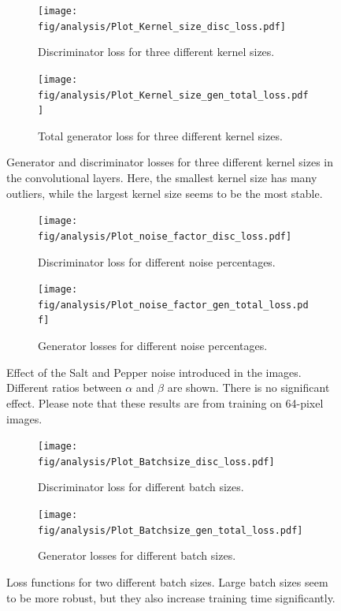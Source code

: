 \documentclass[fleqn,usenatbib,twocolumn]{mnras}
\begin{document}
\begin{figure}
	\centering
	\begin{subfigure}{\linewidth}
		\centering
		\texttt{[image: fig/analysis/Plot\_Kernel\_size\_disc\_loss.pdf]}
		\caption{Discriminator loss for three different kernel sizes. }
		\label{fig:Plot_kernel_size_discloss}
	\end{subfigure}\hfill
	\begin{subfigure}{\linewidth}
		\centering
		\texttt{[image: fig/analysis/Plot\_Kernel\_size\_gen\_total\_loss.pdf]}
		\caption{Total generator loss for three different kernel sizes.}
		\label{fig:Plot_kernel_size_genloss}
	\end{subfigure}\hfill
	\caption{Generator and discriminator losses for three different kernel sizes in the convolutional layers. Here, the smallest kernel size has many outliers, while the largest kernel size seems to be the most stable.}
	\label{fig:Plot_kernel_size_loss}
\end{figure}
\begin{figure}
	\centering
	\begin{subfigure}{0.5\linewidth}
		\centering
		\texttt{[image: fig/analysis/Plot\_noise\_factor\_disc\_loss.pdf]}
		\caption{Discriminator loss for different noise percentages.}
		\label{fig:Plot_noise_discloss}
	\end{subfigure}\hfill
	\begin{subfigure}{0.5\linewidth}
		\centering
		\texttt{[image: fig/analysis/Plot\_noise\_factor\_gen\_total\_loss.pdf]}
		\caption{Generator losses for different noise percentages.}
		\label{fig:Plot_noise_genloss}
	\end{subfigure}\hfill
	\caption{Effect of the Salt and Pepper noise introduced in the images. Different ratios between $\alpha$ and $\beta$ are shown. There is no significant effect. Please note that these results are from training on 64-pixel images.}
	\label{fig:Plot_noise_loss}
\end{figure}
\begin{figure}
	\centering
	\begin{subfigure}{0.5\linewidth}
		\centering
		\texttt{[image: fig/analysis/Plot\_Batchsize\_disc\_loss.pdf]}
		\caption{Discriminator loss for different batch sizes.}
		\label{fig:Plot_batchsize_discloss}
	\end{subfigure}\hfill
	\begin{subfigure}{0.5\linewidth}
		\centering
		\texttt{[image: fig/analysis/Plot\_Batchsize\_gen\_total\_loss.pdf]}
		\caption{Generator losses for different batch sizes.}
		\label{fig:Plot_batchsize_genloss}
	\end{subfigure}\hfill
	\caption{Loss functions for two different batch sizes. Large batch sizes seem to be more robust, but they also increase training time significantly. }
	\label{fig:Plot_batchsize_loss}
\end{figure}
\end{document}
